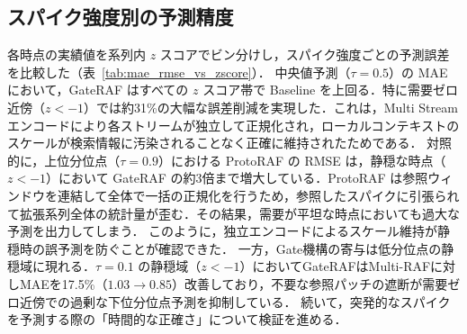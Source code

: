 \documentclass[twocolumn, lastpage]{jarticle}
\begin{document}
\subsection{スパイク強度別の予測精度}
各時点の実績値を系列内 $z$ スコアでビン分けし，スパイク強度ごとの予測誤差を比較した（表~\ref{tab:mae_rmse_vs_zscore}）．
中央値予測（$\tau=0.5$）の MAE において，GateRAF はすべての $z$ スコア帯で Baseline を上回る．特に需要ゼロ近傍（$z < -1$）では約31\%の大幅な誤差削減を実現した．これは，Multi Streamエンコードにより各ストリームが独立して正規化され，ローカルコンテキストのスケールが検索情報に汚染されることなく正確に維持されたためである．
対照的に，上位分位点（$\tau=0.9$）における ProtoRAF の RMSE は，静穏な時点（$z < -1$）において GateRAF の約3倍まで増大している．ProtoRAF は参照ウィンドウを連結して全体で一括の正規化を行うため，参照したスパイクに引張られて拡張系列全体の統計量が歪む．その結果，需要が平坦な時点においても過大な予測を出力してしまう．
このように，独立エンコードによるスケール維持が静穏時の誤予測を防ぐことが確認できた．
一方，Gate機構の寄与は低分位点の静穏域に現れる．$\tau=0.1$ の静穏域（$z < -1$）においてGateRAFはMulti-RAFに対しMAEを17.5\%（$1.03 \to 0.85$）改善しており，不要な参照パッチの遮断が需要ゼロ近傍での過剰な下位分位点予測を抑制している．
続いて，突発的なスパイクを予測する際の「時間的な正確さ」について検証を進める．
\end{document}
